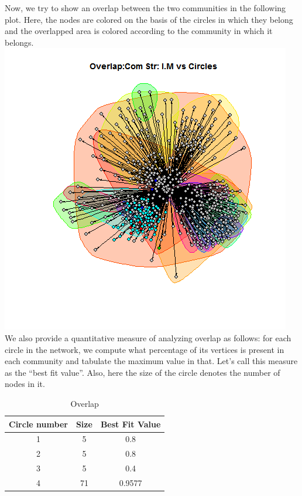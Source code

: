 \documentclass{article}
\begin{document}
\begin{enumerate}
 Now, we try to show an overlap between the two communities in the following plot.
Here, the nodes are colored on the basis of the circles in which they belong and 
the overlapped area is colored according to the community in which it belongs.\\
 \includegraphics[scale=0.7]{7_2e} \\
 
 We also provide a quantitative measure of analyzing overlap as follows: for each circle in the network,
 we compute what percentage of its vertices is present in each community and tabulate the maximum value in that.
 Let's call this measure as the ``best fit value''. Also, here the size of the circle denotes the number of nodes in it.
\begin{table}[ht]
\caption{Overlap}
\centering
\begin{tabular}{| c | c | c |}
\hline\hline
\newline

Circle number & Size & Best Fit Value \\ [0.5ex]
\hline

1 & 5 & 0.8 \\
\hline
2 & 5 & 0.8 \\
\hline
3 & 5 & 0.4 \\
\hline
4 & 71 & 0.9577 \\
\hline
\end{tabular}
\end{table} 


\end{enumerate}
\end{document}
